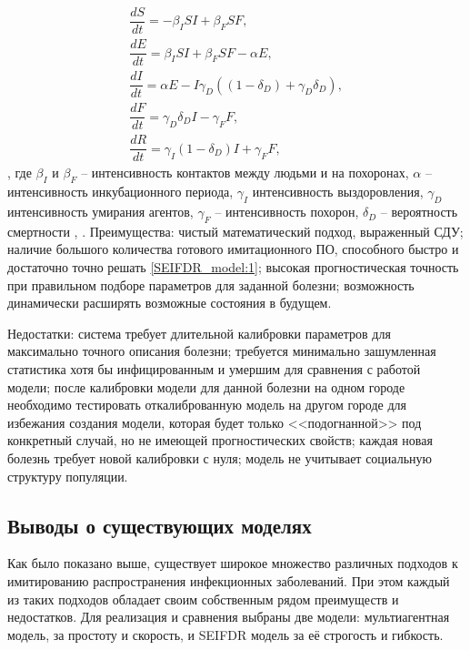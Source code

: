 \begin{gather} 
\nonumber	\dfrac{dS}{dt} = -\beta_I S I + \beta_F S F, \\
\nonumber	\dfrac{dE}{dt} = \beta_I S I + \beta_F S F - \alpha E, \\
	\dfrac{dI}{dt} = \alpha E - I \gamma_D ( (1 - \delta_D) + \gamma_D \delta_D), \label{SEIFDR_model:1} \\
\nonumber	\dfrac{dF}{dt} = \gamma_D \delta_D I - \gamma_F F, \\
\nonumber	\dfrac{dR}{dt} = \gamma_I(1-\delta_D) I + \gamma_F F,
\end{gather}
,  где $\beta_I$ и $\beta_F$ -- интенсивность контактов между людьми и на похоронах, $\alpha$ --  интенсивность инкубационного периода, $\gamma_I$ интенсивность выздоровления, $\gamma_D$  интенсивность умирания агентов, $\gamma_F$ --   интенсивность похорон, $\delta_D$ -- вероятность смертности 
\cite{Plos_Outbreak:1}, \cite{Plos_Outbreak:2}. 
Преимущества: чистый математический подход, выраженный СДУ; наличие большого количества готового имитационного ПО, способного быстро и достаточно точно решать \eqref{SEIFDR_model:1}; высокая прогностическая точность при правильном подборе параметров для заданной болезни; возможность динамически расширять возможные состояния в будущем.

Недостатки: система требует длительной калибровки параметров для максимально точного описания болезни; требуется минимально зашумленная статистика хотя бы инфицированным и умершим для сравнения с работой модели; после калибровки модели для данной болезни на одном городе необходимо тестировать откалиброванную модель на другом городе для избежания создания модели, которая будет только <<подогнанной>> под конкретный случай, но не имеющей прогностических свойств; каждая новая болезнь требует новой калибровки с нуля; модель не учитывает социальную структуру популяции.
\subsection{Выводы о существующих моделях}


Как было показано выше, существует широкое множество различных подходов к имитированию распространения инфекционных заболеваний. При этом каждый из таких подходов обладает своим собственным рядом преимуществ и недостатков. Для реализация и сравнения выбраны две модели: мультиагентная модель, за простоту и скорость, и SEIFDR модель за её строгость и гибкость.